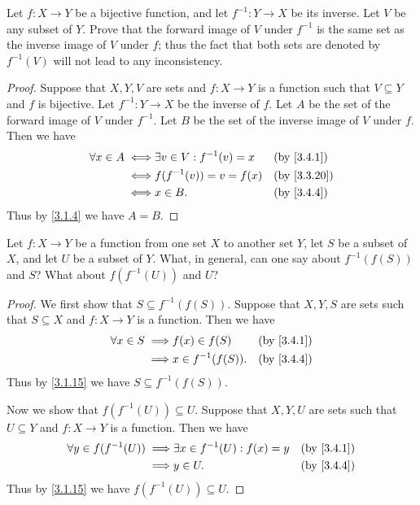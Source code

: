 \exercisesection

\begin{ex}\label{ex:3.4.1}
	Let \(f : X \to Y\) be a bijective function, and let \(f^{-1} : Y \to X\) be its inverse.
	Let \(V\) be any subset of \(Y\).
	Prove that the forward image of \(V\) under \(f^{-1}\) is the same set as the inverse image of \(V\) under \(f\);
	thus the fact that both sets are denoted by \(f^{-1}(V)\) will not lead to any inconsistency.
\end{ex}

\begin{proof}
	Suppose that \(X, Y, V\) are sets and \(f : X \to Y\) is a function such that \(V \subseteq Y\) and \(f\) is bijective.
	Let \(f^{-1} : Y \to X\) be the inverse of \(f\).
	Let \(A\) be the set of the forward image of \(V\) under \(f^{-1}\).
	Let \(B\) be the set of the inverse image of \(V\) under \(f\).
	Then we have
	\begin{align*}
		\forall x \in A \iff & \exists v \in V : f^{-1}(v) = x &  & \by{3.4.1}  \\
		\iff                 & f(f^{-1}(v)) = v = f(x)         &  & \by{3.3.20} \\
		\iff                 & x \in B.                        &  & \by{3.4.4}
	\end{align*}
	Thus by \cref{3.1.4} we have \(A = B\).
\end{proof}

\begin{ex}\label{ex:3.4.2}
	Let \(f : X \to Y\) be a function from one set \(X\) to another set \(Y\), let \(S\) be a subset of \(X\), and let \(U\) be a subset of \(Y\).
	What, in general, can one say about \(f^{-1}(f(S))\) and \(S\)?
	What about \(f(f^{-1}(U))\) and \(U\)?
\end{ex}

\begin{proof}
	We first show that \(S \subseteq f^{-1}(f(S))\).
	Suppose that \(X, Y, S\) are sets such that \(S \subseteq X\) and \(f : X \to Y\) is a function.
	Then we have
	\begin{align*}
		\forall x \in S \implies & f(x) \in f(S)       &  & \by{3.4.1} \\
		\implies                 & x \in f^{-1}(f(S)). &  & \by{3.4.4}
	\end{align*}
	Thus by \cref{3.1.15} we have \(S \subseteq f^{-1}(f(S))\).

	Now we show that \(f(f^{-1}(U)) \subseteq U\).
	Suppose that \(X, Y, U\) are sets such that \(U \subseteq Y\) and \(f : X \to Y\) is a function.
	Then we have
	\begin{align*}
		\forall y \in f(f^{-1}(U)) \implies & \exists x \in f^{-1}(U) : f(x) = y &  & \by{3.4.1} \\
		\implies                            & y \in U.                           &  & \by{3.4.4}
	\end{align*}
	Thus by \cref{3.1.15} we have \(f(f^{-1}(U)) \subseteq U\).
\end{proof}

